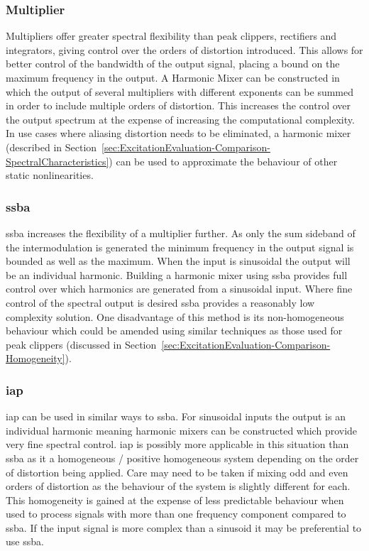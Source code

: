 		\subsubsection*{Multiplier}
			Multipliers offer greater spectral flexibility than peak clippers, rectifiers and integrators,
			giving control over the orders of distortion introduced. This allows for better control of the
			bandwidth of the output signal, placing a bound on the maximum frequency in the output. A Harmonic
			Mixer can be constructed in which the output of several multipliers with different exponents can be
			summed in order to include multiple orders of distortion. This increases the control over the
			output spectrum at the expense of increasing the computational complexity. In use cases where
			aliasing distortion needs to be eliminated, a harmonic mixer (described in
			Section~\ref{sec:ExcitationEvaluation-Comparison-SpectralCharacteristics}) can be used to
			approximate the behaviour of other static nonlinearities.

		\subsubsection*{\acrshort{ssba}}
			\acrshort{ssba} increases the flexibility of a multiplier further. As only the sum sideband of the
			intermodulation is generated the minimum frequency in the output signal is bounded as well as the
			maximum. When the input is sinusoidal the output will be an individual harmonic. Building a
			harmonic mixer using \acrshort{ssba} provides full control over which harmonics are generated from
			a sinusoidal input. Where fine control of the spectral output is desired \acrshort{ssba} provides a
			reasonably low complexity solution. One disadvantage of this method is its non-homogeneous
			behaviour which could be amended using similar techniques as those used for peak clippers
			(discussed in Section~\ref{sec:ExcitationEvaluation-Comparison-Homogeneity}).

		\subsubsection*{\acrshort{iap}}
			\acrshort{iap} can be used in similar ways to \acrshort{ssba}. For sinusoidal inputs the output is
			an individual harmonic meaning harmonic mixers can be constructed which provide very fine spectral
			control. \acrshort{iap} is possibly more applicable in this situation than \acrshort{ssba} as it a
			homogeneous / positive homogeneous system depending on the order of distortion being applied. Care
			may need to be taken if mixing odd and even orders of distortion as the behaviour of the system is
			slightly different for each. This homogeneity is gained at the expense of less predictable
			behaviour when used to process signals with more than one frequency component compared to
			\acrshort{ssba}. If the input signal is more complex than a sinusoid it may be preferential to use
			\acrshort{ssba}.

